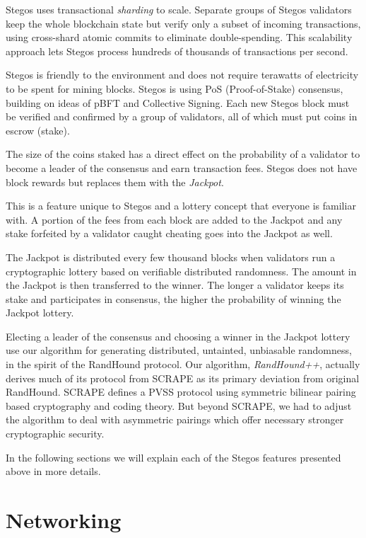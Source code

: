\documentclass[a4paper, 10pt, conference]{ieeeconf}
\begin{document}
Stegos uses transactional \textit{sharding} to scale. Separate gro\-ups of Stegos validators keep the whole blockchain state but verify only a subset of incoming transactions, using cross-shard atomic commits to eliminate double-spending. This scalability approach lets Stegos process hundreds of thousands of transactions per second.

Stegos is friendly to the environment and does not require terawatts of electricity to be spent for mining blocks. Stegos is using PoS (Proof-of-Stake) consensus, building on ideas of pBFT\cite{c9} and Collective Signing\cite{c10}\cite{c11}. Each new Stegos block must be verified and confirmed by a group of validators, all of which must put coins in escrow (stake).

The size of the coins staked has a direct effect on the probability of a validator to become a leader of the consensus and earn transaction fees. Stegos does not have block rewards but replaces them with the \textit{Jackpot}.

This is a feature unique to Stegos and a lottery concept that everyone is familiar with. A portion of the fees from each block are added to the Jackpot and any stake forfeited by a validator caught cheating goes into the Jackpot as well.

The Jackpot is distributed every few thousand blocks when validators run a cryptographic lottery based on verifiable distributed randomness. The amount in the Jackpot is then transferred to the winner. The longer a validator keeps its stake and participates in consensus, the higher the probability of winning the Jackpot lottery.

Electing a leader of the consensus and choosing a winner in the Jackpot lottery use our algorithm for generating distributed, untainted, unbiasable randomness, in the spirit of the RandHound protocol\cite{c12}. Our algorithm, \textit{RandHound++}, actually derives much of its protocol from SCRAPE\cite{c13} as its primary deviation from original RandHound. SCRAPE defines a PVSS\cite{c14} protocol using symmetric bilinear pairing based cryptography and coding theory. But beyond SCRAPE, we had to adjust the algorithm to deal with asymmetric pairings which offer necessary stronger cryptographic security.

In the following sections we will explain each of the Stegos features presented above in more details.

\section{Networking}\label{networking}
\end{document}
